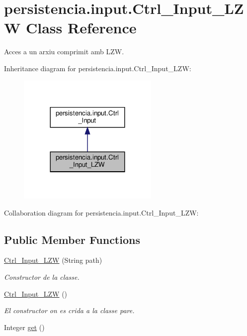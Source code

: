 \hypertarget{classpersistencia_1_1input_1_1Ctrl__Input__LZW}{}\section{persistencia.\+input.\+Ctrl\+\_\+\+Input\+\_\+\+L\+ZW Class Reference}
\label{classpersistencia_1_1input_1_1Ctrl__Input__LZW}


Acces a un arxiu comprimit amb L\+ZW.  




Inheritance diagram for persistencia.\+input.\+Ctrl\+\_\+\+Input\+\_\+\+L\+ZW\+:\nopagebreak
\begin{figure}[H]
\begin{center}
\leavevmode
\includegraphics[width=192pt]{classpersistencia_1_1input_1_1Ctrl__Input__LZW__inherit__graph}
\end{center}
\end{figure}


Collaboration diagram for persistencia.\+input.\+Ctrl\+\_\+\+Input\+\_\+\+L\+ZW\+:
\subsection*{Public Member Functions}
\begin{DoxyCompactItemize}
\item 
\hyperlink{classpersistencia_1_1input_1_1Ctrl__Input__LZW_a31503f303ac443e110379322e851791a}{Ctrl\+\_\+\+Input\+\_\+\+L\+ZW} (String path)
\begin{DoxyCompactList}\small\item\em Constructor de la classe. \end{DoxyCompactList}\item 
\hyperlink{classpersistencia_1_1input_1_1Ctrl__Input__LZW_a1b5319954e229993f11201438c72fe34}{Ctrl\+\_\+\+Input\+\_\+\+L\+ZW} ()
\begin{DoxyCompactList}\small\item\em El constructor on es crida a la classe pare. \end{DoxyCompactList}\item 
Integer \hyperlink{classpersistencia_1_1input_1_1Ctrl__Input__LZW_a821592197863ec1b1f052a794753ea40}{get} ()
\end{DoxyCompactItemize}
